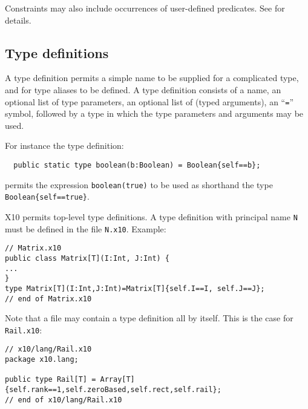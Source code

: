 Constraints may also include occurrences of user-defined
predicates. See \cite{X10RefManual} for details.

\subsection{Type definitions}

A type definition permits a simple name to be supplied for a
complicated type, and for type aliases to be defined. A type
definition consists of a name, an optional list of type parameters, an
optional list of (typed arguments), an ``{\tt =}'' symbol, followed by
a type in which the type parameters and arguments may be used.

For instance the type definition:
{\footnotesize
\begin{verbatim}
  public static type boolean(b:Boolean) = Boolean{self==b};
\end{verbatim}}
\noindent permits the expression {\tt boolean(true)} to be used as shorthand the type {\tt Boolean\{self==true\}}.

X10 permits top-level type definitions. A type definition with
principal name {\tt N} must be defined in the file
{\tt N.x10}. Example:

{\footnotesize
\begin{verbatim}
// Matrix.x10
public class Matrix[T](I:Int, J:Int) { 
...
}
type Matrix[T](I:Int,J:Int)=Matrix[T]{self.I==I, self.J==J};
// end of Matrix.x10
\end{verbatim}}

Note that a file may contain a type definition all by itself. This is
the case for {\tt Rail.x10}:

{\footnotesize
\begin{verbatim}
// x10/lang/Rail.x10
package x10.lang;

public type Rail[T] = Array[T]{self.rank==1,self.zeroBased,self.rect,self.rail};
// end of x10/lang/Rail.x10
\end{verbatim}}







